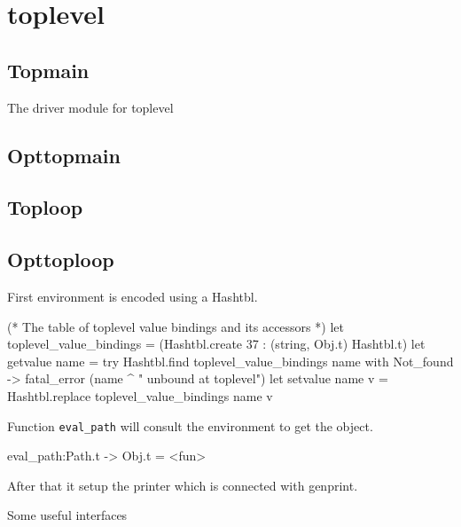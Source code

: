 

\section{toplevel}


\subsection{Topmain}
The driver module for toplevel
\subsection{Opttopmain}


\subsection{Toploop}
\subsection{Opttoploop}
First environment is encoded using a Hashtbl.
\begin{ocamlcode}
(* The table of toplevel value bindings and its accessors *)
let toplevel_value_bindings =
  (Hashtbl.create 37 : (string, Obj.t) Hashtbl.t)
let getvalue name =
  try
    Hashtbl.find toplevel_value_bindings name
  with Not_found ->
    fatal_error (name ^ " unbound at toplevel")
let setvalue name v =
  Hashtbl.replace toplevel_value_bindings name v
\end{ocamlcode}

Function \verb|eval_path| will consult the environment to 
get the object.

\begin{ocamlcode}
eval_path:Path.t -> Obj.t = <fun>
\end{ocamlcode}
After that it setup the printer which is connected with genprint.

Some useful interfaces

